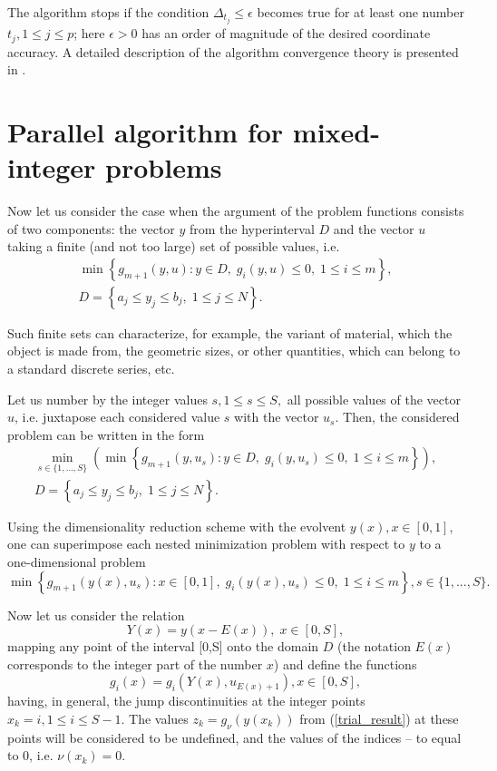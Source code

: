 \documentclass{llncs}
\begin{document}
The algorithm stops if the condition $\Delta_{t_j}\leq \epsilon$ becomes true for at least one 
number $t_j, 1\leq j \leq p$; here  $\epsilon>0$ has an order of magnitude of the desired 
coordinate accuracy.
A detailed description of the algorithm convergence theory is presented in \cite{Strongin2000}.

\section{Parallel algorithm for mixed-integer problems}
Now let us consider the case when the argument of the problem functions consists of two 
components: the vector $y$ from the hyperinterval $D$ and the vector $u$ taking a finite 
(and not too large) set of possible values, i.e. 
\begin{gather}\label{problem_i}
\min{\left\{ g_{m+1}(y,u):y\in D, \; g_i(y,u)\leq 0, \; 1 \leq i \leq m\right\}},\\
D=\left\{a_j\leq y_j \leq b_j, \; 1\leq j \leq N \right\}.\nonumber
\end{gather}

Such finite sets can characterize, for example, the variant of material, which the object is made 
from, the geometric sizes, or other quantities, which can belong to a standard discrete series, etc. 

Let us number by the integer values $s, 1\leq s \leq S,$ all possible values of the vector $u$, i.e. 
juxtapose each considered value $s$ with the vector $u_s$. 
Then, the considered problem can be written in the form 
\begin{gather}\label{problem_is}
 \min_{s\in\{1,...,S\}}\left(\min{\left\{ g_{m+1}(y,u_s):y\in D, \; g_i(y,u_s)\leq 0, \; 1 \leq i \leq 
m\right\}}\right),\\
D=\left\{ a_j\leq y_j \leq b_j, \; 1 \leq j\leq N \right\}.\nonumber 
\end{gather}

Using the dimensionality reduction scheme with the evolvent $y(x), x\in [0,1]$, one can 
superimpose each nested minimization problem with respect to $y$ to a one-dimensional 
problem 
\[
 \min{\left\{ g_{m+1}(y(x),u_s):x \in [0,1], \; g_i(y(x),u_s)\leq 0, \; 1 \leq i \leq m\right\}}, 
s\in\{1,...,S\}.
\]

Now let us consider the relation 
\[
Y(x)=y(x-E(x)), \; x\in[0,S],
\]
mapping any point of the interval [0,S] onto the domain $D$ (the notation $E(x)$ corresponds 
to the integer part of the number $x$) and define the functions 
\[
g_i(x) = g_i(Y(x),u_{E(x)+1}), x\in[0,S],
\]
having, in general, the jump discontinuities at the integer points $x_k = i, 1\leq i \leq 
S-1$.
The values $z_k = g_\nu(y(x_k))$ from (\ref{trial_result}) at these points will be considered to 
be undefined, and the values of the indices -- to equal to 0, i.e. $\nu(x_k) = 0$.
\end{document}
